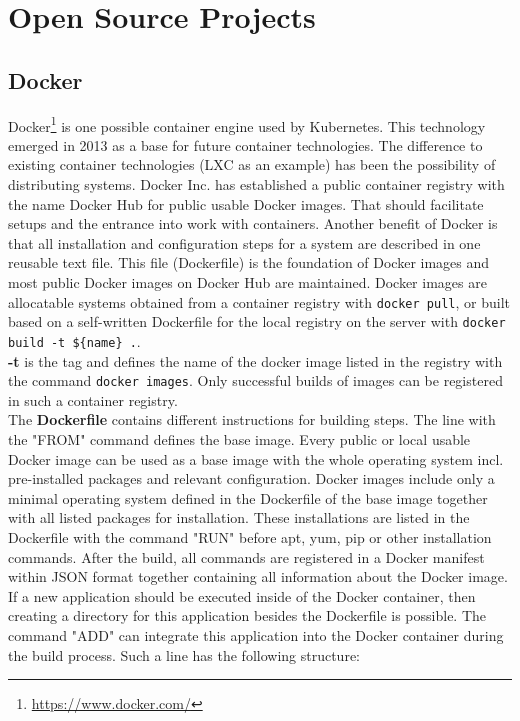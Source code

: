 \section{Open Source Projects}

\subsection{Docker}

Docker\footnote{\url{https://www.docker.com/}} is one possible container engine used by Kubernetes. This technology emerged in 2013 as a base for future container technologies. 
The difference to existing container technologies (LXC as an example) has been the possibility of distributing systems. 
Docker Inc. has established a public container registry with the name Docker Hub for public usable Docker images. That should facilitate setups and the entrance into work with containers. Another benefit of Docker is that all installation and configuration steps for a system are described in one reusable text file. 
This file (Dockerfile) is the foundation of Docker images and most public Docker images on Docker Hub are maintained.
Docker images are allocatable systems obtained from a container registry with \lstinline!docker pull!, or built based on a self-written Dockerfile for the local registry on the server with \lstinline!docker build -t ${name} .!. \\ \textbf{-t} is the tag and defines the name of the docker image listed in the registry with the command \lstinline!docker images!. Only successful builds of images can be registered in such a container registry. \\
The \textbf{Dockerfile} contains different instructions for building steps. The line with the "FROM" command defines the base image. Every public or local usable Docker image can be used as a base image with the whole operating system incl. pre-installed packages and relevant configuration. Docker images include only a minimal operating system defined in the Dockerfile of the base image together with all listed packages for installation. These installations are listed in the Dockerfile with the command "RUN" before apt, yum, pip or other installation commands. 
After the build, all commands are registered in a Docker manifest within JSON format together containing all information about the Docker image.
If a new application should be executed inside of the Docker container, then creating a directory for this application besides the Dockerfile is possible. The command "ADD" can integrate this application into the Docker container during the build process. Such a line has the following structure: \\
